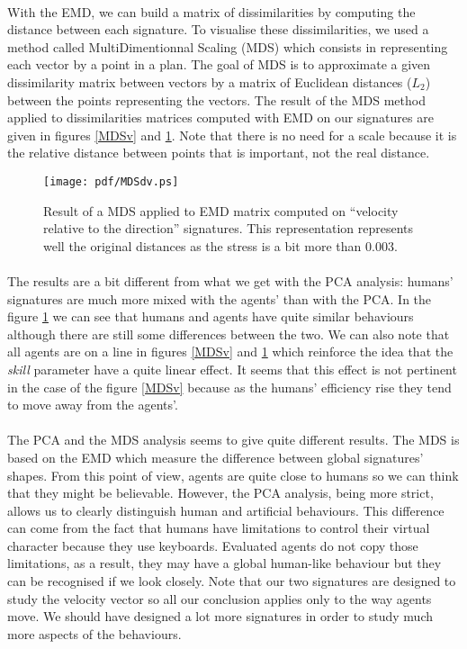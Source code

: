 \documentclass[a4paper,twocolumn]{article}
\begin{document}
\paragraph{}%
With the EMD, we can build a matrix of dissimilarities by computing the distance between each signature. To visualise these dissimilarities, we used a method called MultiDimentionnal Scaling (MDS) which consists in representing each vector by a point in a plan. The goal of MDS is to approximate a given dissimilarity matrix between vectors by a matrix of Euclidean distances ($L_2$) between the points representing the vectors. The result of the MDS method applied to dissimilarities matrices computed with EMD on our signatures are given in figures \ref{MDSv} and \ref{MDSdv}. Note that there is no need for a scale because it is the relative distance between points that is important, not the real distance.
\begin{figure}[!ht]
	\texttt{[image: pdf/MDSdv.ps]}
	\caption{Result of a MDS applied to EMD matrix computed on ``velocity relative to the direction'' signatures. This representation represents well the original distances as the stress is a bit more than 0.003.}
	\label{MDSdv}
\end{figure}
\paragraph{}%
The results are a bit different from what we get with the PCA analysis: humans' signatures are much more mixed with the agents' than with the PCA. In the figure \ref{MDSdv} we can see that humans and agents have quite similar behaviours although there are still some differences between the two. We can also note that all agents are on a line in figures \ref{MDSv} and \ref{MDSdv} which reinforce the idea that the \emph{skill} parameter have a quite linear effect. It seems that this effect is not pertinent in the case of the figure \ref{MDSv} because as the humans' efficiency rise they tend to move away from the agents'.
\paragraph{}%
The PCA and the MDS analysis seems to give quite different results. The MDS is based on the EMD which measure the difference between global signatures' shapes. From this point of view, agents are quite close to humans so we can think that they might be believable. However, the PCA analysis, being more strict, allows us to clearly distinguish human and artificial behaviours. This difference can come from the fact that humans have limitations to control their virtual character because they use keyboards. Evaluated agents do not copy those limitations, as a result, they may have a global human-like behaviour but they can be recognised if we look closely. Note that our two signatures are designed to study the velocity vector so all our conclusion applies only to the way agents move. We should have designed a lot more signatures in order to study much more aspects of the behaviours.
\end{document}
